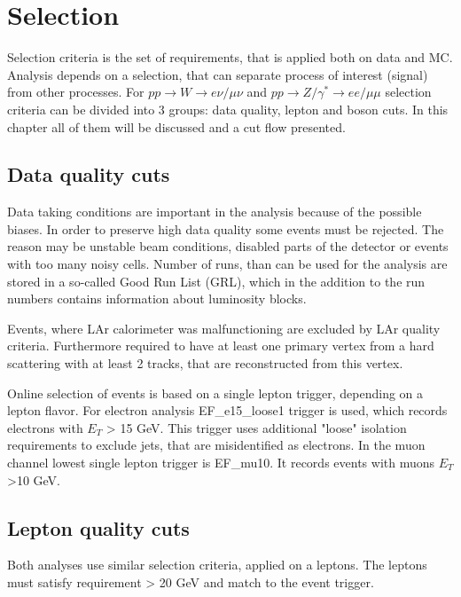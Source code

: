 \chapter{Selection}\label{chap:EventSelection}
Selection criteria is the set of requirements, that is applied both on data and MC. Analysis depends on a selection, that can separate process of interest (signal) from other processes. For $pp \to W \to e\nu/\mu\nu$ and $pp \to Z/\gamma^* \to ee/\mu\mu$ selection criteria can be divided into 3 groups: data quality, lepton and boson cuts. In this chapter all of them will be discussed and a cut flow presented.
\section{Data quality cuts}




Data taking conditions are important in the analysis because of the possible biases. In order to preserve high data quality some events must be rejected. The reason may be unstable beam conditions, disabled parts of the detector or events with too many noisy cells. Number of runs, than can be used for the analysis are stored in a so-called Good Run List (GRL), which in the addition to the run numbers contains information about luminosity blocks. 

Events, where LAr calorimeter was malfunctioning are excluded by LAr quality criteria. Furthermore required to have at least one primary vertex from a hard scattering with at least 2 tracks, that are reconstructed from this vertex. 

Online selection of events is based on a single lepton trigger, depending on a lepton flavor. For electron analysis EF\_e15\_loose1 trigger is used, which records electrons with $E_T$ > 15 GeV. This trigger uses additional "loose" isolation requirements to exclude jets, that are misidentified as electrons. In the muon channel lowest single lepton trigger is EF\_mu10.  It records events with muons $E_T$ >10 GeV.

\section{Lepton quality cuts}

Both analyses use similar selection criteria, applied on a leptons. The leptons must satisfy requirement \ptl > 20 GeV and match to the event trigger.

